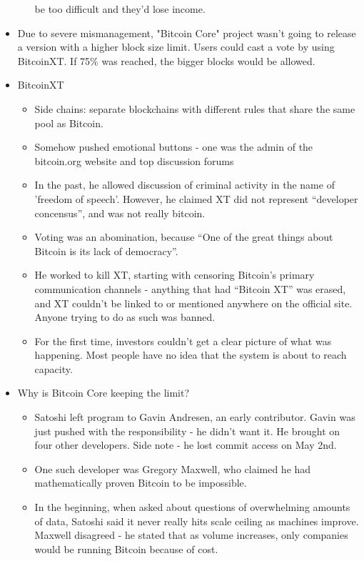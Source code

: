 \documentclass{article}
\begin{document}
\begin{itemize}
\begin{itemize}
        be too difficult and they'd lose income.
    \end{itemize}
  \item Due to severe mismanagement, "Bitcoin Core" project wasn't going to release a version with a higher block size limit.
    \subitem Users could cast a vote by using BitcoinXT. If 75\% was reached, the bigger blocks would be allowed.
  \item BitcoinXT
    \begin{itemize}
      \item Side chains: separate blockchains with different rules that share the same pool as Bitcoin.
      \item Somehow pushed emotional buttons - one was the admin of the bitcoin.org website and top discussion forums
      \item In the past, he allowed discussion of criminal activity in the name of 'freedom of speech'. However, he claimed
        XT did not represent ``developer concensus'', and was not really bitcoin.
      \item Voting was an abomination, because ``One of the great things about Bitcoin is its lack of democracy''.
      \item He worked to kill XT, starting with censoring Bitcoin's primary communication channels - anything that had ``Bitcoin XT''
        was erased, and XT couldn't be linked to or mentioned anywhere on the official site. Anyone trying to do as such was banned.
      \item For the first time, investors couldn't get a clear picture of what was happening. Most people have no idea that the system is
        about to reach capacity.
    \end{itemize}
  \item Why is Bitcoin Core keeping the limit?
    \begin{itemize}
      \item Satoshi left program to Gavin Andresen, an early contributor. Gavin was just pushed with the responsibility - he didn't want it. He brought on 
        four other developers.
        \subitem Side note - he lost commit access on May 2nd.
      \item One such developer was Gregory Maxwell, who claimed he had mathematically proven Bitcoin to be impossible. 
      \item In the beginning, when asked about questions of overwhelming amounts of data, Satoshi said it never really hits scale ceiling as machines improve.
        \subitem Maxwell disagreed - he stated that as volume increases, only companies would be running Bitcoin because of cost.

\end{itemize}
\end{itemize}
\end{document}
